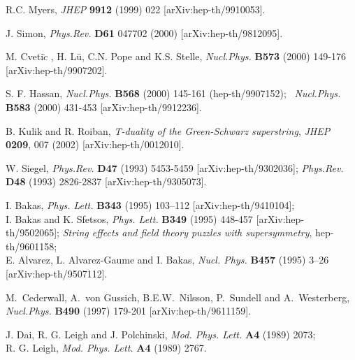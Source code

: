 \documentclass[a4paper,11pt]{article}
\begin{document}
\begin{thebibliography}{99}
R.C. Myers, 
{\em JHEP} {\bf 9912} (1999) 022 
[arXiv:hep-th/9910053]. 


J. Simon, 
{\em Phys.Rev.} {\bf D61} 047702 (2000) [arXiv:hep-th/9812095].


M. Cveti$\breve{c}$ , H. L\"{u}, C.N. Pope and K.S. Stelle,
{\em Nucl.Phys.} {\bf B573} (2000) 149-176
[arXiv:hep-th/9907202].

S. F. Hassan, 
{\em Nucl.Phys.} {\bf B568} (2000) 145-161 (hep-th/9907152); \, 
{\em Nucl.Phys.} {\bf B583} (2000) 431-453 
[arXiv:hep-th/9912236]. 

 B.  Kulik and R. Roiban, 
{\sl T-duality of the Green-Schwarz superstring}, 
{\em JHEP} {\bf 0209}, 007 (2002) [arXiv:hep-th/0012010].

 W. Siegel, 
{\em Phys.Rev.} {\bf D47} (1993) 5453-5459 [arXiv:hep-th/9302036]; 
 {\em Phys.Rev.} {\bf D48} (1993) 2826-2837 [arXiv:hep-th/9305073]. 

 I. Bakas, 
{\em Phys. Lett.} {\bf B343} (1995) 103--112
 [arXiv:hep-th/9410104];
 \\ I. Bakas and K. Sfetsos, 
 {\em Phys. Lett.} {\bf B349} (1995) 448-457 [arXiv:hep-th/9502065];
 {\sl String effects and field theory puzzles with supersymmetry},
 hep-th/9601158;
\\ E. Alvarez, L. Alvarez-Gaume and I. Bakas,
 {\em Nucl. Phys.} {\bf B457} (1995) 3--26 [arXiv:hep-th/9507112].
     


M.\ Cederwall, A.\ von Gussich, B.E.W.\ Nilsson, 
P.\ Sundell and  A.\ Westerberg, 
{\em Nucl.Phys.} {\bf B490} (1997) 179-201 [arXiv:hep-th/9611159]. 

J. Dai, R. G. Leigh and J. Polchinski, 
{\em Mod. Phys. Lett.} {\bf A4} (1989) 2073;
\\ R. G.
Leigh, {\em Mod. Phys. Lett.} {\bf A4} (1989) 2767.



\end{thebibliography}
\end{document}
